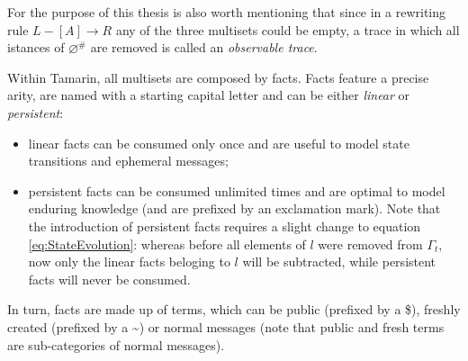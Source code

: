 For the purpose of this thesis is also worth mentioning that since in a rewriting rule $L -[ A ] \rightarrow R$ any of the three multisets could be empty, a trace in which all istances of $\varnothing^{\#}$ are removed is called an \textit{observable trace}. 

Within Tamarin, all multisets are composed by facts. Facts feature a precise arity, are named with a starting capital letter and can be either \textit{linear} or \textit{persistent}:

\begin{itemize}
    \item linear facts can be consumed only once and are useful to model state transitions and ephemeral messages;
    \item persistent facts can be consumed unlimited times and are optimal to model enduring knowledge (and are prefixed by an exclamation mark). Note that the introduction of persistent facts requires a slight change to equation \ref{eq:StateEvolution}: whereas before all elements of $l$ were removed from $\Gamma_t$, now only the linear facts beloging to $l$ will be subtracted, while persistent facts will never be consumed.
\end{itemize}

In turn, facts are made up of terms, which can be public (prefixed by a \$), freshly created (prefixed by a \textasciitilde{}) or normal messages (note that public and fresh terms are sub-categories of normal messages).